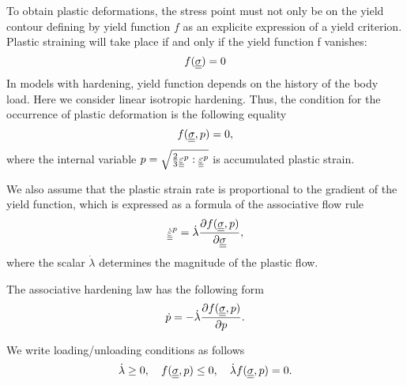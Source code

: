 \documentclass[12pt]{article}
\begin{document}
To obtain plastic deformations, the stress point must not only be on the yield contour defining by yield function $f$ as an explicite expression of a yield criterion. 
Plastic straining will take place if and only if the yield function f vanishes:
\begin{equation}
    f(\underline{\underline{\sigma}}) = 0
\end{equation}
In models with hardening, yield function depends on the history of the body load. Here we consider linear isotropic hardening. Thus, the condition for the occurrence of plastic deformation is the following equality
\begin{equation}
    f(\underline{\underline{\sigma}}, p) = 0, 
\end{equation}
where the internal variable $p = \sqrt{\frac{2}{3}\underline{\underline{\varepsilon}}^p : \underline{\underline{\varepsilon}}^p}$ is accumulated plastic strain.

We also assume that the plastic strain rate is proportional to the gradient of the yield function, which is expressed as a formula of the associative flow rule
\begin{equation}\label{eqn:flow_rule1}
    \dot{\underline{\underline{\varepsilon}}}^p = \dot{\lambda} \frac{\partial f(\underline{\underline{\sigma}}, p)}{\partial \underline{\underline{\sigma}}}, 
\end{equation}
where the scalar $\dot{\lambda}$ determines the magnitude of the plastic flow.

The associative hardening law has the following form
\begin{equation}
    \dot{p} = -\dot{\lambda}\frac{\partial f(\underline{\underline{\sigma}}, p)}{\partial p}.
\end{equation}


We write loading/unloading conditions as follows
\begin{equation}\label{eqn:KKT_conditions}
    \dot{\lambda} \geq 0, \quad f(\underline{\underline{\sigma}}, p) \leq 0, \quad \dot{\lambda}f(\underline{\underline{\sigma}}, p) = 0.
\end{equation}
\end{document}
